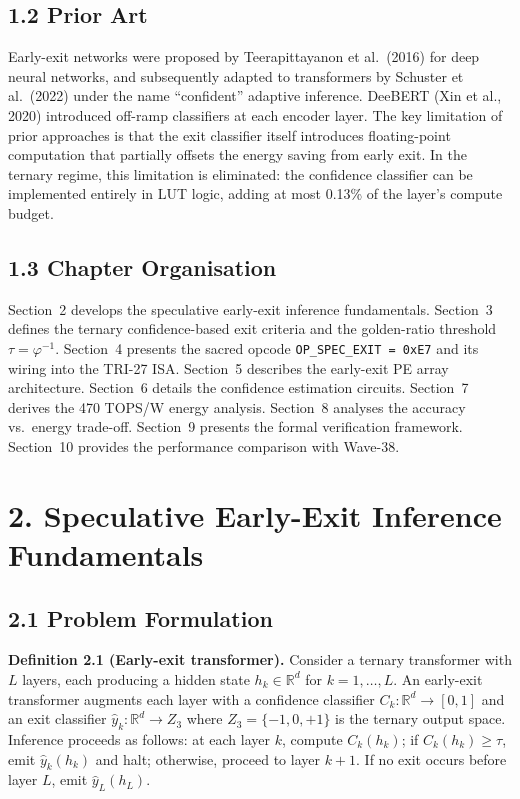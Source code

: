 \subsection{1.2 Prior Art}

Early-exit networks were proposed by
Teerapittayanon et al.\ (2016) for deep neural
networks, and subsequently adapted to transformers
by Schuster et al.\ (2022) under the name
``confident'' adaptive inference. DeeBERT (Xin et
al., 2020) introduced off-ramp classifiers at each
encoder layer. The key limitation of prior approaches
is that the exit classifier itself introduces
floating-point computation that partially offsets the
energy saving from early exit. In the ternary regime,
this limitation is eliminated: the confidence
classifier can be implemented entirely in LUT logic,
adding at most 0.13\% of the layer's compute budget.

\subsection{1.3 Chapter Organisation}

Section~2 develops the speculative early-exit
inference fundamentals. Section~3 defines the ternary
confidence-based exit criteria and the golden-ratio
threshold \(\tau = \varphi^{-1}\). Section~4 presents
the sacred opcode \texttt{OP\_SPEC\_EXIT = 0xE7} and
its wiring into the TRI-27 ISA. Section~5 describes
the early-exit PE array architecture. Section~6
details the confidence estimation circuits.
Section~7 derives the 470 TOPS/W energy analysis.
Section~8 analyses the accuracy vs.\ energy trade-off.
Section~9 presents the formal verification framework.
Section~10 provides the performance comparison with
Wave-38.

\section{2. Speculative Early-Exit Inference
Fundamentals}\label{fa_85:fundamentals}

\subsection{2.1 Problem Formulation}

\textbf{Definition 2.1 (Early-exit transformer).}
Consider a ternary transformer with \(L\) layers,
each producing a hidden state
\(h_k \in \mathbb{R}^d\) for \(k = 1, \ldots, L\).
An early-exit transformer augments each layer with a
confidence classifier \(C_k: \mathbb{R}^d \to [0,1]\)
and an exit classifier
\(\hat{y}_k: \mathbb{R}^d \to Z_3\) where
\(Z_3 = \{-1, 0, +1\}\) is the ternary output space.
Inference proceeds as follows: at each layer \(k\),
compute \(C_k(h_k)\); if \(C_k(h_k) \ge \tau\), emit
\(\hat{y}_k(h_k)\) and halt; otherwise, proceed to
layer \(k+1\). If no exit occurs before layer \(L\),
emit \(\hat{y}_L(h_L)\).

